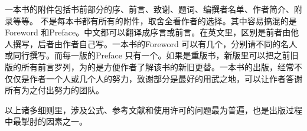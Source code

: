 \documentclass{WileySev}
\begin{document}

\begin{preface}
一本书的附件包括书前部分的序、前言、致谢、题词、编撰者名单、作者简介、附录等等。
不是每本书都有所有的附件，取舍全看作者的选择。其中容易搞混的是Foreword 和Preface。中文都可以翻译成序言或前言。在英文里，区别是前者由他人撰写，后者由作者自己写。一本书的Foreword 可以有几个，分别请不同的名人或同行撰写。而每一版的Preface 只有一个。如果是重版书，新版里可以把之前旧版的所有前言罗列，为的是方便作者了解该书的新旧更替。一本书的出版，经常不仅仅是作者一个人或几个人的努力，致谢部分是最好的用武之地，可以让作者答谢所有为之付出努力的团队。

以上诸多细则里，涉及公式、参考文献和使用许可的问题最为普遍，也是出版过程中最掣肘的因素之一。
\end{preface}










\end{document}
